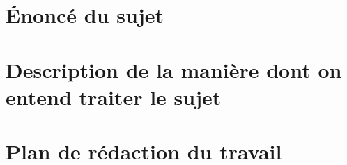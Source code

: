 \documentclass[12pt,letterpaper]{article}
\begin{document}
\setlength{\parindent}{0in}
\pagestyle{fancy}
\fancyhf{}
\fancyfoot[C]{\thepage}
\tableofcontents
\newpage
\section{Énoncé du sujet}

\section{Description de la manière dont on entend traiter le sujet}

\section{Plan de rédaction du travail}



\end{document}

